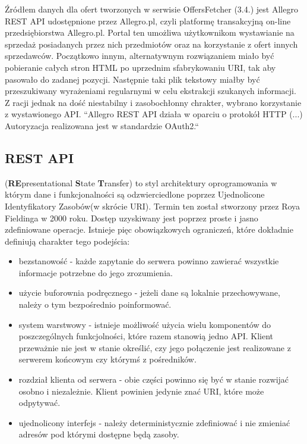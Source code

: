 Źródłem danych dla ofert tworzonych w serwisie OffersFetcher (3.4.)
jest Allegro REST API udostępnione przez Allegro.pl, czyli platformę transakcyjną on-line przedsiębiorstwa Allegro.pl. Portal ten umożliwa użytkownikom wystawianie na sprzedaż posiadanych przez nich przedmiotów oraz na korzystanie z ofert innych sprzedawców.  Początkowo innym, alternatywnym rozwiązaniem miało być pobieranie całych stron HTML po uprzednim sfabrykowaniu URI, tak aby pasowało do zadanej pozycji. Następnie taki plik tekstowy miałby być przeszukiwany wyrażeniami regularnymi w celu ekstrakcji szukanych informacji. Z racji jednak na dość niestabilny i zasobochłonny chrakter, wybrano korzystanie z wystawionego API.
``Allegro REST API działa w oparciu o protokół HTTP (...) Autoryzacja realizowana jest w standardzie OAuth2.``~\cite{allegroApi}\linebreak

\subsection{REST API}
(\textbf{RE}presentational \textbf{S}tate \textbf{T}ransfer) to styl architektury oprogramowania w którym dane i funkcjonalności są odzwierciedlone poprzez Ujednolicone Identyfikatory Zasobów(w skrócie URI). Termin ten został stworzony przez Roya Fieldinga w 2000 roku. Dostęp uzyskiwany jest poprzez proste i jasno zdefiniowane operacje. \linebreak Istnieje pięc obowiązkowych ograniczeń, które dokładnie definiują charakter tego podejścia:
\begin{itemize}
	\item bezstanowość - każde zapytanie do serwera powinno zawierać wszystkie informacje potrzebne do jego zrozumienia.
	\item użycie buforownia podręcznego - jeżeli dane są lokalnie przechowywane, należy o tym bezpośrednio poinformować.
	\item system warstwowy - istnieje możliwość użycia wielu komponentów do poszczególnych funkcjolności, które razem stanowią jedno API. Klient przeważnie nie jest w stanie określić, czy jego połączenie jest realizowane z serwerem końcowym czy którymś z pośredników.
	\item rozdział klienta od serwera - obie części powinno się być w stanie rozwijać osobno i niezależnie. Klient powinien jedynie znać URI, które może odpytywać.
	\item ujednolicony interfejs - należy deterministycznie zdefiniować i nie zmieniać adresów pod którymi dostępne będą zasoby. 
\end{itemize}~\cite{fielding}

